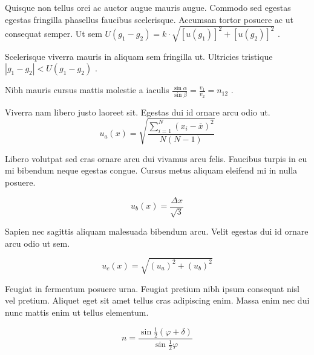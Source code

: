 \documentclass{article}
\begin{document}
Quisque non tellus orci ac auctor augue mauris augue. Commodo sed egestas egestas fringilla phasellus faucibus scelerisque. Accumsan tortor posuere ac ut consequat semper. Ut sem 
\begin{math}
	U(g_1-g_2)=k\cdot \sqrt{[u(g_1)]^2+[u(g_2)]^2}
\end{math}
.\newline

Scelerisque viverra mauris in aliquam sem fringilla ut. Ultricies tristique 
$ |g_1-g_2|<U(g_1-g_2) $
.\newline

Nibh mauris cursus mattis molestie a iaculis 
\( \frac{\sin \alpha}{\sin \beta}=\frac{v_1}{v_2}=n_{12} \)
.\newline

Viverra nam libero justo laoreet sit. Egestas dui id ornare arcu odio ut.
\[ u_a(x)=\sqrt{\frac{\sum_{i=1}^{N} (x_i-\overline{x})^2}{N(N-1)}} \]

Libero volutpat sed cras ornare arcu dui vivamus arcu felis. Faucibus turpis in eu mi bibendum neque egestas congue. Cursus metus aliquam eleifend mi in nulla posuere.

$$ u_b(x)=\frac{\Delta x}{\sqrt{3}} $$

Sapien nec sagittis aliquam malesuada bibendum arcu. Velit egestas dui id ornare arcu odio ut sem. 

\begin{displaymath}
	u_c(x)=\sqrt{(u_a)^2+(u_b)^2}
\end{displaymath}

Feugiat in fermentum posuere urna. Feugiat pretium nibh ipsum consequat nisl vel pretium. Aliquet eget sit amet tellus cras adipiscing enim. Massa enim nec dui nunc mattis enim ut tellus elementum.

\begin{equation}
	n=\frac{\sin \frac{1}{2}(\varphi +\delta)}{\sin \frac{1}{2}\varphi}
\end{equation}
\end{document}
